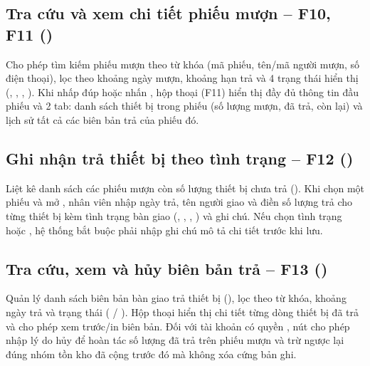 \subsection{Tra cứu và xem chi tiết phiếu mượn – F10, F11 (\texorpdfstring{}{LoanSearchPage.cs})}

Cho phép tìm kiếm phiếu mượn theo từ khóa (mã phiếu, tên/mã người mượn, số điện thoại), lọc theo khoảng ngày mượn, khoảng hạn trả và 4 trạng thái hiển thị (, , , ). Khi nhấp đúp hoặc nhấn , hộp thoại  (F11) hiển thị đầy đủ thông tin đầu phiếu và 2 tab: danh sách thiết bị trong phiếu (số lượng mượn, đã trả, còn lại) và lịch sử tất cả các biên bản trả của phiếu đó.


\subsection{Ghi nhận trả thiết bị theo tình trạng – F12 (\texorpdfstring{}{ReturnCreatePage.cs})}

Liệt kê danh sách các phiếu mượn còn số lượng thiết bị chưa trả (). Khi chọn một phiếu và mở , nhân viên nhập ngày trả, tên người giao và điền số lượng trả cho từng thiết bị kèm tình trạng bàn giao (, , , ) và ghi chú. Nếu chọn tình trạng  hoặc , hệ thống bắt buộc phải nhập ghi chú mô tả chi tiết trước khi lưu.


\subsection{Tra cứu, xem và hủy biên bản trả – F13 (\texorpdfstring{}{ReturnRecordPage.cs})}

Quản lý danh sách biên bản bàn giao trả thiết bị (), lọc theo từ khóa, khoảng ngày trả và trạng thái ( / ). Hộp thoại  hiển thị chi tiết từng dòng thiết bị đã trả và cho phép xem trước/in biên bản. Đối với tài khoản có quyền , nút  cho phép nhập lý do hủy để hoàn tác số lượng đã trả trên phiếu mượn và trừ ngược lại đúng nhóm tồn kho đã cộng trước đó mà không xóa cứng bản ghi.


